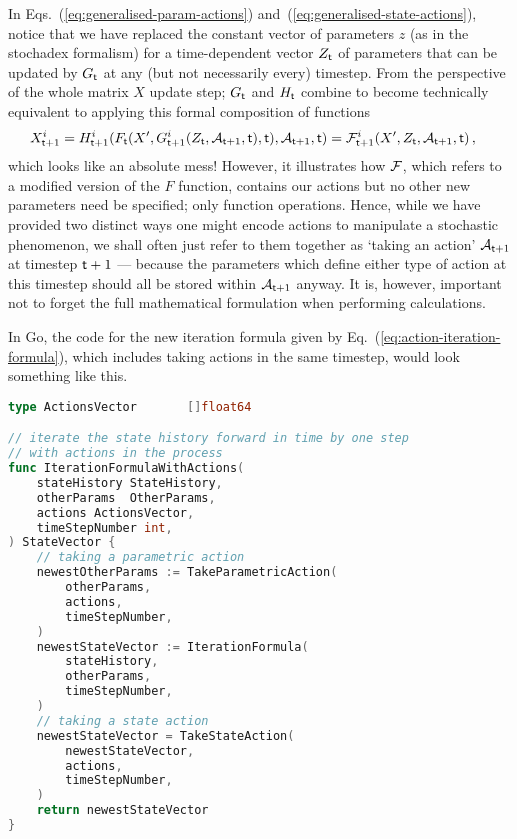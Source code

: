 In Eqs.~(\ref{eq:generalised-param-actions}) and~(\ref{eq:generalised-state-actions}), notice that we have replaced the constant vector of parameters $z$ (as in the stochadex formalism) for a time-dependent vector $Z_{{\sf t}}$ of parameters that can be updated by $G_{\sf t}$ at any (but not necessarily every) timestep. From the perspective of the whole matrix $X$ update step; $G_{\sf t}$ and $H_{\sf t}$ combine to become technically equivalent to applying this formal composition of functions
\begin{align}
X^i_{{\sf t}+1} &= H^i_{{\sf t}+1}(F_{\sf t}(X', G_{{\sf t}+1}^i(Z_{{\sf t}}, {\cal A}_{{\sf t}+1}, {\sf t}), {\sf t}), {\cal A}_{{\sf t}+1}, {\sf t}) = {\cal F}^i_{{\sf t}+1}(X', Z_{{\sf t}}, {\cal A}_{{\sf t}+1}, {\sf t}) \label{eq:action-iteration-formula}\,,
\end{align}
which looks like an absolute mess! However, it illustrates how ${\cal F}$, which refers to a modified version of the $F$ function, contains our actions but no other new parameters need be specified; only function operations. Hence, while we have provided two distinct ways one might encode actions to manipulate a stochastic phenomenon, we shall often just refer to them together as `taking an action' ${\cal A}_{{\sf t}+1}$ at timestep ${\sf t}+1$ --- because the parameters which define either type of action at this timestep should all be stored within ${\cal A}_{{\sf t}+1}$ anyway. It is, however, important not to forget the full mathematical formulation when performing calculations. 

In Go, the code for the new iteration formula given by Eq.~(\ref{eq:action-iteration-formula}), which includes taking actions in the same timestep, would look something like this.

\begin{lstlisting}[language=Go]
type ActionsVector       []float64

// iterate the state history forward in time by one step
// with actions in the process
func IterationFormulaWithActions(
    stateHistory StateHistory, 
    otherParams  OtherParams,
    actions ActionsVector,
    timeStepNumber int,
) StateVector {
    // taking a parametric action
    newestOtherParams := TakeParametricAction(
        otherParams, 
        actions,
        timeStepNumber,
    )
    newestStateVector := IterationFormula(
        stateHistory, 
        otherParams,
        timeStepNumber,
    )
    // taking a state action
    newestStateVector = TakeStateAction(
        newestStateVector,
        actions,
        timeStepNumber,
    )
    return newestStateVector
}
\end{lstlisting}
